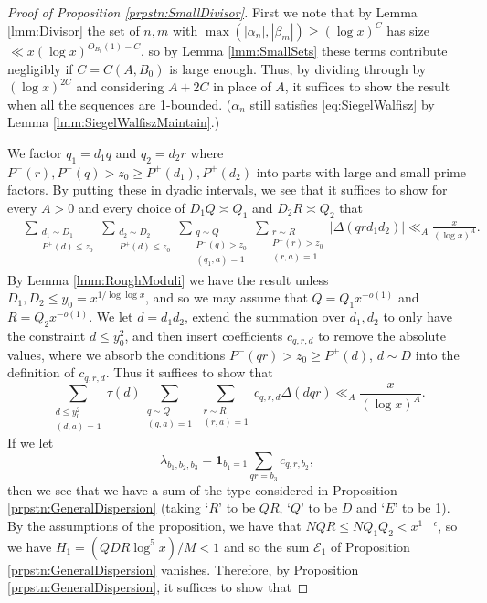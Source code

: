 \documentclass[10pt]{amsart}
\theoremstyle{plain}
\numberwithin{equation}{section}
\begin{document}
%
%
%
%
%
%
%
%
\begin{proof}[Proof of Proposition \ref{prpstn:SmallDivisor}]
First we note that by Lemma \ref{lmm:Divisor} the set of $n,m$ with $\max(|\alpha_n|,|\beta_m|)\ge(\log{x})^C$ has size $\ll x(\log{x})^{O_{B_0}(1)-C}$, so by Lemma \ref{lmm:SmallSets} these terms contribute negligibly if $C=C(A,B_0)$ is large enough. Thus, by dividing through by $(\log{x})^{2C}$ and considering $A+2C$ in place of $A$, it suffices to show the result when all the sequences are 1-bounded. ($\alpha_n$ still satisfies \eqref{eq:SiegelWalfisz} by Lemma \ref{lmm:SiegelWalfiszMaintain}.)

We factor $q_1=d_1 q$ and $q_2=d_2 r$ where $P^-(r),P^-(q)>z_0\ge P^+(d_1),P^+(d_2)$ into parts with large and small prime factors. By putting these in dyadic intervals, we see that it suffices to show for every $A>0$ and every choice of $D_1 Q\asymp Q_1$ and $D_2 R\asymp Q_2$ that
 \begin{align*}
 &\sum_{\substack{d_1\sim D_1\\ P^+(d)\le z_0}}\sum_{\substack{d_2\sim D_2\\ P^+(d)\le z_0}}\sum_{\substack{q\sim Q\\ P^-(q)>z_0 \\ (q_1,a)=1}}\sum_{\substack{r\sim R\\ P^-(r)>z_0\\ (r,a)=1}}|\Delta(q r d_1 d_2)|\ll_{A}\frac{x}{(\log{x})^A}.
 \end{align*}
By Lemma \ref{lmm:RoughModuli} we have the result unless $D_1,D_2\le y_0=x^{1/\log\log{x}}$, and so we may assume that $Q=Q_1x^{-o(1)}$ and $R=Q_2x^{-o(1)}$. We let $d=d_1d_2$, extend the summation over $d_1,d_2$ to only have the constraint $d\le y_0^2$, and then insert coefficients $c_{q,r,d}$ to remove the absolute values, where we absorb the conditions $P^-(qr)>z_0\ge P^+(d)$, $d\sim D$ into the definition of $c_{q,r,d}$. Thus it suffices to show that
\[
\sum_{\substack{d\le y_0^2\\ (d,a)=1}}\tau(d)\sum_{\substack{q\sim Q\\ (q,a)=1}}\sum_{\substack{r\sim R\\ (r,a)=1}} c_{q,r,d}\Delta(d q r)\ll_{A} \frac{x}{(\log{x})^A}.
\]
If we let 
\[
\lambda_{b_1,b_2,b_3}=\mathbf{1}_{b_1=1}\sum_{q r=b_3}c_{q,r,b_2},
\]
then we see that we have a sum of the type considered in Proposition \ref{prpstn:GeneralDispersion} (taking `$R$' to be $QR$, `$Q$' to be $D$ and `$E$' to be 1). By the assumptions of the proposition, we have that $N Q R\le N Q_1 Q_2<x^{1-\epsilon}$, so we have $H_1=(Q D R\log^5{x})/M<1$ and so the sum $\mathscr{E}_1$ of Proposition \ref{prpstn:GeneralDispersion} vanishes. Therefore, by Proposition \ref{prpstn:GeneralDispersion}, it suffices to show that

\end{proof}
\end{document}
